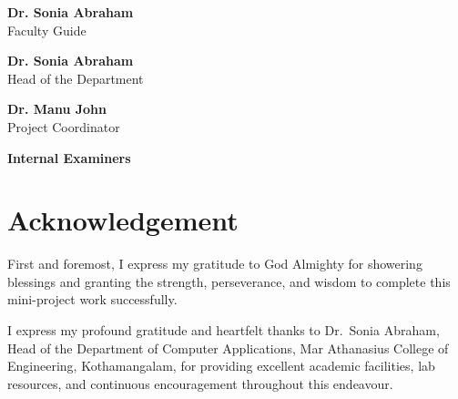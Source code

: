 \begin{center}
    \vfill

    \noindent
    \begin{minipage}[t]{0.45\textwidth}
        \textbf{Dr. Sonia Abraham}\\
        Faculty Guide
    \end{minipage}
    \hfill
    \begin{minipage}[t]{0.45\textwidth}
        \raggedleft
        \textbf{Dr. Sonia Abraham}\\
        Head of the Department
    \end{minipage}

    \vspace{1.5cm}

    \noindent
    \begin{minipage}[t]{0.45\textwidth}
        \textbf{Dr. Manu John}\\
        Project Coordinator
    \end{minipage}
    \hfill
    \begin{minipage}[t]{0.45\textwidth}
        \raggedleft
        \textbf{Internal Examiners}
    \end{minipage}
    \vspace*{0.2cm}
\end{center}

\newpage
{}
\setcounter{page}{1}
\pagestyle{frontmatter}


{}
\chapter*{Acknowledgement}

First and foremost, I express my gratitude to God Almighty for showering blessings and granting the strength, perseverance, and wisdom to complete this mini-project work successfully.

\vspace{0.4cm}
\noindent I express my profound gratitude and heartfelt thanks to Dr.~Sonia Abraham, Head of the Department of Computer Applications, Mar Athanasius College of Engineering, Kothamangalam, for providing excellent academic facilities, lab resources, and continuous encouragement throughout this endeavour.

